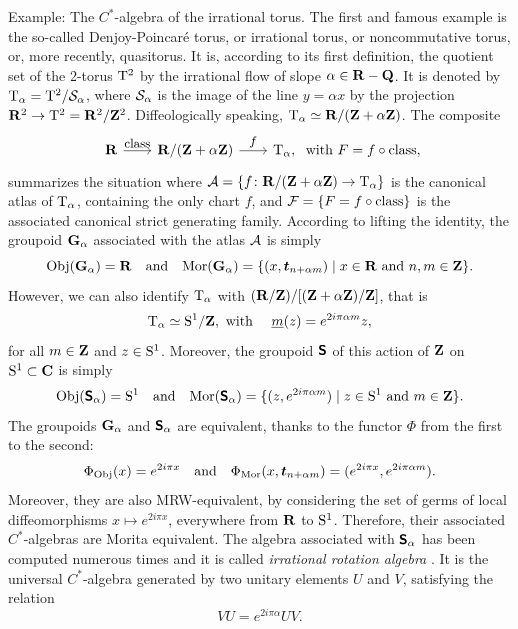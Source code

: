 \begin{Article}{Example: The $C^*$-algebra of the irrational torus.}{}
  The first and famous example is the so-called Denjoy-Poincaré torus,
  or irrational torus,
  or noncommutative torus,
  or,
  more recently,
  quasitorus.
  It is,
  according to its first definition,
  the quotient set of the $2$-torus $\mathrm{T}^2$ by the irrational flow of slope $\alpha \in \mathbf{R} - \mathbf{Q}$.
  It is denoted by $\mathrm{T}_\alpha = \mathrm{T}^2/\mathcal{S}_\alpha$,
  where $\mathcal{S}_\alpha$ is the image of the line $y=\alpha x$ by the projection $\mathbf{R}^2 \to \mathrm{T}^2 = \mathbf{R}^2/\mathbf{Z}^2$.
  Diffeologically speaking,
  $\mathrm{T}_\alpha \simeq \mathbf{R}/(\mathbf{Z} + \alpha \mathbf{Z})$.
  The composite
  \[
    \begin{tikzcd}[column sep=2em,row sep=1.2em, every label/.append style = {font = \small}]
    \RR \arrow[r,"\Class"] & \RR/(\ZZ + \alpha \ZZ) \arrow[r, "f"] & \Torus_\alpha,
    \end{tikzcd}
    \text{ with }
    F = f \circ \Class,
    \]
  summarizes the situation where $\mathcal{A} = \{ f \colon  \mathbf{R}/(\mathbf{Z} + \alpha \mathbf{Z}) \to \mathrm{T}_\alpha\}$ is the canonical atlas of $\mathrm{T}_\alpha$,
  containing the only chart $f$,
  and
  $\mathcal{F} = \{F = f \circ \operatorname{class} \}$ is the associated canonical strict generating family.
  According to lifting the identity,
  the groupoid ${\mathbf G}_\alpha$ associated with the atlas $\mathcal{A}$ is simply
  \[
    {\operatorname{Obj}}({\mathbf G}_\alpha) = \mathbf{R}
    \quad \text{and} \quad
    {\operatorname{Mor}}({\mathbf G}_\alpha) = \{ (x,{\boldsymbol t}_{n+\alpha m}) \mid x \in \mathbf{R} \text{ and } n,m \in \mathbf{Z}\}.
    \]
  However,
  we can also identify $\mathrm{T}_\alpha$ with $(\mathbf{R}/\mathbf{Z})/ [(\mathbf{Z} + \alpha \mathbf{Z})/\mathbf{Z}]$,
  that is
  \[
    \mathrm{T}_\alpha \simeq \mathrm{S}^1/\mathbf{Z},
    \text{ with } \quad \underline{m}(z) = e^{2i\pi\alpha m} z,
    \]
  for all $m \in \mathbf{Z}$ and $z \in \mathrm{S}^1$.
  Moreover,
  the groupoid $\bS$ of this action of $\mathbf{Z}$ on $\mathrm{S}^1 \subset \mathbf{C}$ is simply
  \[
    \Obj(\bS_\alpha) = \Sph^1
    \quad \text{and} \quad
    \Mor(\bS_\alpha) = \{ (z,e^{2i\pi \alpha m}) \mid z \in \Sph^1 \text{ and } m \in \ZZ\}.
    \]
  The groupoids ${\mathbf G}_\alpha$ and $\bS_\alpha$ are equivalent,
  thanks to the functor $\Phi$ from the first to the second:
  \[
    \Phi_{{\operatorname{Obj}}}(x) = e^{2i\pi x}
    \quad \text{and} \quad
    \Phi_{{\operatorname{Mor}}}(x,{\boldsymbol t}_{n + \alpha m}) = (e^{2i\pi x}, e^{2i\pi\alpha m}).
    \]
  Moreover,
  they are also MRW-equivalent,
  by considering the set of germs of local diffeomorphisms $x \mapsto e^{2i\pi x}$,
  everywhere from $\mathbf{R}$ to $\mathrm{S}^1$.
  Therefore,
  their associated $C^*$-algebras are Morita equivalent.
  The algebra associated with $\bS_\alpha$ has been computed numerous times and it is called \emph{irrational rotation algebra} \cite{Rie81}.
  It is the universal $C^*$-algebra generated by two unitary elements $U$ and $V$,
  satisfying the relation
  \[
    VU = e^{2i\pi\alpha}UV.
    \]
  

\end{Article}
